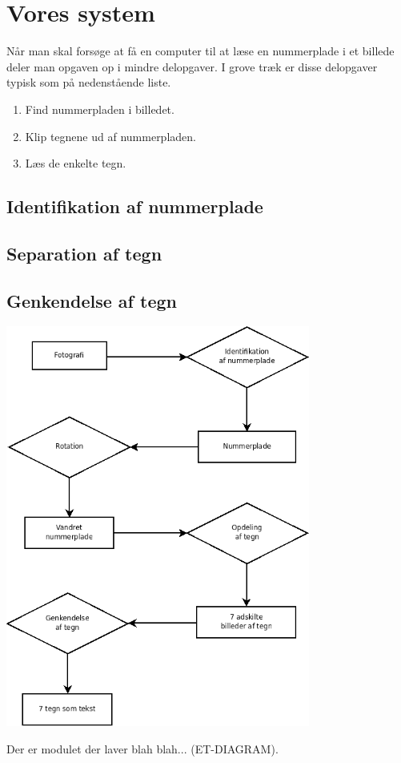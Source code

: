 \section{Vores system}

Når man skal forsøge at få en computer til at læse en nummerplade i et billede deler man opgaven op i mindre delopgaver. I grove træk er disse delopgaver typisk som på nedenstående liste.

\begin{enumerate}
\item Find nummerpladen i billedet.
\item Klip tegnene ud af nummerpladen.
\item Læs de enkelte tegn.
\end{enumerate} 

\subsection{Identifikation af nummerplade}



\subsection{Separation af tegn}



\subsection{Genkendelse af tegn}




\includegraphics[width=10cm]{indledning/illu/overordnet_system.png} 

Der er modulet der laver blah blah... (ET-DIAGRAM).

